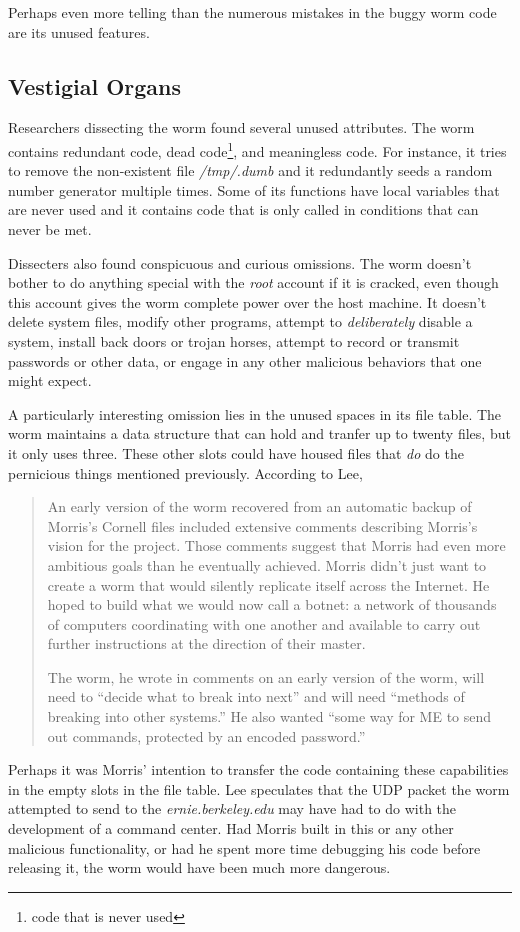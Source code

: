 Perhaps even more telling than the numerous mistakes in the buggy worm code
are its unused features.


\subsection*{Vestigial Organs}

Researchers dissecting the worm found several
unused attributes. The worm contains redundant code, dead code\footnote{code
that is never used}, and meaningless code. For instance, it tries to remove the
non-existent file \textit{/tmp/.dumb} and it redundantly seeds a random number
generator multiple times. Some of its functions have local variables that are
never used and it contains code that is only called in conditions that can
never be met. 

Dissecters also found conspicuous and curious omissions. The worm doesn't bother
to do anything special with the \textit{root} account if it is cracked, even
though this account gives the worm complete power over the host machine.
It doesn't delete system files, modify other programs, attempt to
\textit{deliberately} disable a system, install back doors or trojan horses,
attempt to record or transmit passwords or other data, or engage in any other
malicious behaviors that one might expect. 

A particularly interesting omission lies in the unused spaces in its file table.
The worm maintains a data structure that can hold and tranfer
up to twenty files, but it only uses three. These other slots could have
housed files that \textit{do} do the pernicious things
mentioned previously. According to Lee\cite{lee_washpost_2013},

\begin{quote}
An early version of the worm recovered from an automatic backup of Morris's
Cornell files included extensive comments describing Morris's vision for the
project. Those comments suggest that Morris had even more ambitious goals than
he eventually achieved. Morris didn't just want to create a worm that would
silently replicate itself across the Internet. He hoped to build what we would
now call a botnet: a network of thousands of computers coordinating with one
another and available to carry out further instructions at the direction of
their master.

The worm, he wrote in comments on an early version of the worm, will need to
``decide what to break into next'' and will need ``methods of breaking into other
systems.'' He also wanted ``some way for ME to send out commands, protected by an
encoded password.''
\end{quote}

Perhaps it was Morris' intention to transfer the code containing these
capabilities in the empty slots in the file table. Lee\cite{lee_washpost_2013}
speculates that the UDP packet the worm attempted to send to the 
\textit{ernie.berkeley.edu} may have had to do with the development of a
command center. Had Morris built in this or any other malicious functionality,
or had he spent more time debugging his code before releasing it, the
worm would have been much more dangerous.

